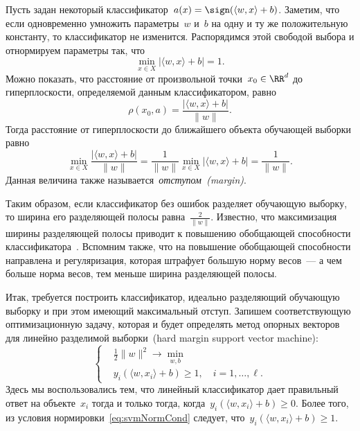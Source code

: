 \documentclass[12pt,fleqn]{article}
\begin{document}
Пусть задан некоторый классификатор~$a(x) = \sign (\langle w, x \rangle + b)$.
Заметим, что если одновременно умножить параметры~$w$ и~$b$
на одну и ту же положительную константу,
то классификатор не изменится.
Распорядимся этой свободой выбора и отнормируем параметры так, что
\begin{equation}
\label{eq:svmNormCond}
    \min_{x \in X} | \langle w, x \rangle + b| = 1.
\end{equation}
Можно показать, что расстояние от произвольной точки~$x_0 \in \RR^d$ до гиперплоскости,
определяемой данным классификатором, равно
\[
    \rho(x_0, a)
    =
    \frac{
        |\langle w, x \rangle + b|
    }{
        \|w\|
    }.
\]
Тогда расстояние от гиперплоскости до ближайшего объекта обучающей выборки равно
\[
    \min_{x \in X}
    \frac{
        |\langle w, x \rangle + b|
    }{
        \|w\|
    }
    =
    \frac{1}{\|w\|} \min_{x \in X} |\langle w, x \rangle + b|
    =
    \frac{1}{\|w\|}.
\]
Данная величина также называется~\emph{отступом~(margin)}.

Таким образом, если классификатор без ошибок разделяет обучающую выборку,
то ширина его разделяющей полосы равна~$\frac{2}{\|w\|}$.
Известно, что максимизация ширины разделяющей полосы приводит
к повышению обобщающей способности классификатора~\cite{mohri12foundations}.
Вспомним также, что на повышение обобщающей способности направлена и регуляризация,
которая штрафует большую норму весов~--- а чем больше норма весов,
тем меньше ширина разделяющей полосы.

Итак, требуется построить классификатор, идеально разделяющий обучающую выборку
и при этом имеющий максимальный отступ.
Запишем соответствующую оптимизационную задачу,
которая и будет определять метод опорных векторов для линейно разделимой выборки~(hard margin support vector machine):
\begin{equation}
\label{eq:svmSep}
    \left\{
        \begin{aligned}
            & \frac{1}{2} \|w\|^2 \to \min_{w, b} \\
            & y_i \left(
                \langle w, x_i \rangle + b
            \right) \geq 1, \quad i = 1, \dots, \ell.
        \end{aligned}
    \right.
\end{equation}
Здесь мы воспользовались тем, что линейный классификатор дает правильный ответ
на объекте~$x_i$ тогда и только тогда, когда~$y_i (\langle w, x_i \rangle + b) \geq 0$.
Более того, из условия нормировки~\eqref{eq:svmNormCond} следует,
что~$y_i (\langle w, x_i \rangle + b) \geq 1$.
\end{document}
